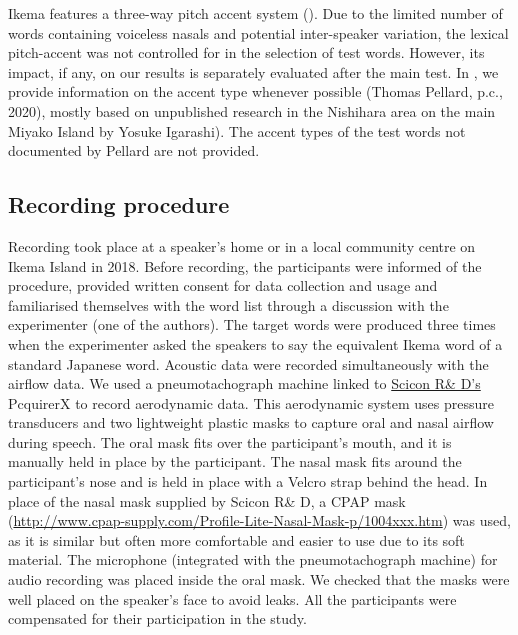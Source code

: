\documentclass[output=paper]{langscibook}
\begin{document}
Ikema features a three-way pitch accent system (). Due to the limited number of words containing voiceless nasals and potential inter-speaker variation, the lexical pitch-accent was not controlled for in the selection of test words. However, its impact, if any, on our results is separately evaluated after the main test. In , we provide information on the accent type whenever possible (Thomas Pellard, p.c., 2020), mostly based on unpublished research in the Nishihara area on the main Miyako Island by Yosuke Igarashi). The accent types of the test words not documented by Pellard are not provided.

\subsection{Recording procedure}
\label{sec:shinohara:3.3}
Recording took place at a speaker’s home or in a local community centre on Ikema Island in 2018. Before recording, the participants were informed of the procedure, provided written consent for data collection and usage and familiarised themselves with the word list through a discussion with the experimenter (one of the authors). The target words were produced three times when the experimenter asked the speakers to say the equivalent Ikema word of a standard Japanese word. Acoustic data were recorded simultaneously with the airflow data. We used a pneumotachograph machine linked to \href{http://www.sciconrd.com/}{Scicon R\& D’s} PcquirerX to record aerodynamic data. This aerodynamic system uses pressure transducers and two lightweight plastic masks to capture oral and nasal airflow during speech. The oral mask fits over the participant’s mouth, and it is manually held in place by the participant. The nasal mask fits around the participant’s nose and is held in place with a Velcro strap behind the head. In place of the nasal mask supplied by Scicon R\& D, a CPAP mask (\url{http://www.cpap-supply.com/Profile-Lite-Nasal-Mask-p/1004xxx.htm}) was used, as it is similar but often more comfortable and easier to use due to its soft material. The microphone (integrated with the pneumotachograph machine) for audio recording was placed inside the oral mask. We checked that the masks were well placed on the speaker’s face to avoid leaks. All the participants were compensated for their participation in the study. 
\end{document}
